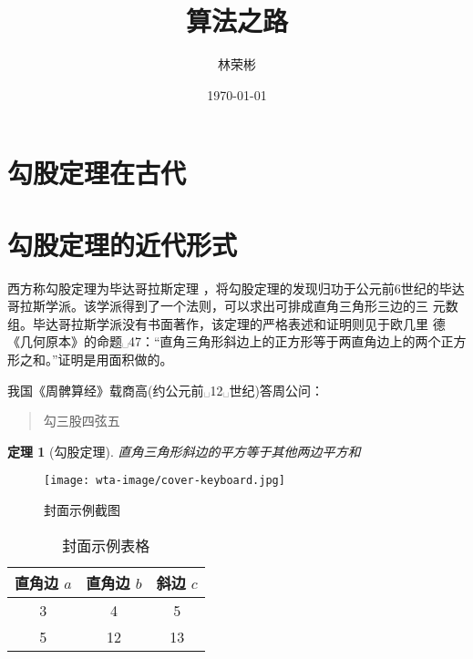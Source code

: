 \documentclass[UTF8]{ctexart}
\title{算法之路}
\author{林荣彬}
\date{\today}
\newtheorem{theorem}{定理}
\begin{document}
\maketitle
\tableofcontents
\section{勾股定理在古代}
\section{勾股定理的近代形式}


西方称勾股定理为毕达哥拉斯定理 \cite{cormen2009introduction}，将勾股定理的发现归功于公元前6世纪的毕达哥拉斯学派。该学派得到了一个法则，可以求出可排成直角三角形三边的三 元数组。毕达哥拉斯学派没有书面著作，该定理的严格表述和证明则见于欧几里 德《几何原本》的命题␣47：``直角三角形斜边上的正方形等于两直角边上的两个正方形之和。''证明是用面积做的。

我国《周髀算经》载商高(约公元前␣12␣世纪)答周公问：
\begin{quote}
    勾三股四弦五
\end{quote}

\begin{theorem}[勾股定理]
    直角三角形斜边的平方等于其他两边平方和
\end{theorem}

\begin{figure}[ht]
    \centering
    \texttt{[image: wta-image/cover-keyboard.jpg]}
    \caption{封面示例截图}
    \label{fig:xiantu}
\end{figure}

\begin{table}[htbp]
    \centering
    \begin{tabular}{|ccc|}
        \hline
        直角边 $a$  &  直角边 $b$  &  斜边 $c$  \\
        \hline
        3 & 4 & 5   \\
        5 & 12 & 13 \\
        \hline
    \end{tabular}
    \caption{封面示例表格}
\end{table}
\end{document}
